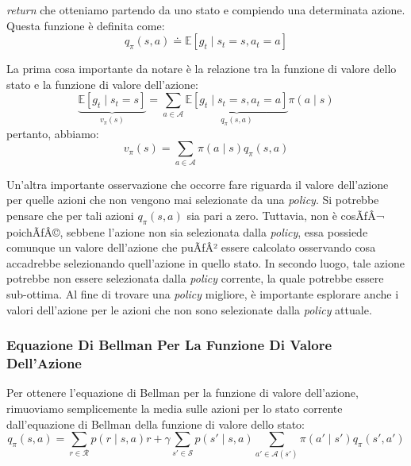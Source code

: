 ﻿\documentclass[11pt, a4paper]{report}
\begin{document}
\newpage

\emph{return} che otteniamo partendo da uno stato e compiendo una determinata azione. Questa funzione è definita come:
\begin{equation}
q_\pi(s, a) \doteq \mathbb{E}[g_t \mid s_t = s, a_t = a]
\end{equation}

La prima cosa importante da notare è la relazione tra la funzione di valore dello stato e la funzione di valore dell'azione:
\begin{equation}
\underbrace{\mathbb{E}[g_t \mid s_t = s]}_{v_\pi(s)} = \sum_{a \in \mathcal{A}} \underbrace{\mathbb{E}[g_t \mid s_t = s, a_t = a]}_{q_\pi(s,a)} \pi(a \mid s)
\end{equation}
pertanto, abbiamo:
\begin{equation}
v_\pi(s) = \sum_{a \in \mathcal{A}} \pi(a \mid s) q_\pi(s, a)
\end{equation}

Un'altra importante osservazione che occorre fare riguarda il valore dell'azione per quelle azioni che non vengono mai selezionate da una \emph{policy}. Si potrebbe pensare che per tali azioni $q_\pi(s, a)$ sia pari a zero. Tuttavia, non è cosÃƒÂ¬ poichÃƒÂ©, sebbene l'azione non sia selezionata dalla \emph{policy}, essa possiede comunque un valore dell'azione che puÃƒÂ² essere calcolato osservando cosa accadrebbe selezionando quell'azione in quello stato. In secondo luogo, tale azione potrebbe non essere selezionata dalla \emph{policy} corrente, la quale potrebbe essere sub-ottima. Al fine di trovare una \emph{policy} migliore, è importante esplorare anche i valori dell'azione per le azioni che non sono selezionate dalla \emph{policy} attuale.

\subsubsection{Equazione Di Bellman Per La Funzione Di Valore Dell'Azione}

Per ottenere l'equazione di Bellman per la funzione di valore dell'azione, rimuoviamo semplicemente la media sulle azioni per lo stato corrente dall'equazione di Bellman della funzione di valore dello stato:
\begin{equation}
q_\pi(s, a) = \sum_{r \in \mathcal{R}} p(r \mid s, a)r + \gamma \sum_{s' \in \mathcal{S}} p(s' \mid s, a) \sum_{a' \in \mathcal{A}(s')} \pi(a' \mid s') q_\pi(s', a')
\end{equation}
\end{document}

